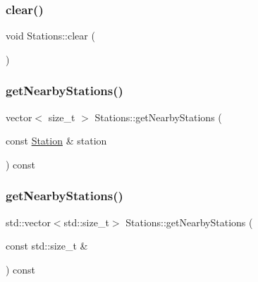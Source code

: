 \mbox{\label{class_stations_a4d69d6bf3e2504d3baccd53a7bd89888}} 
\subsubsection{\texorpdfstring{clear()}{clear()}}
{\footnotesize\ttfamily void Stations\+::clear (\begin{DoxyParamCaption}{ }\end{DoxyParamCaption})\hspace{0.3cm}{\ttfamily [noexcept]}}

\mbox{\label{class_stations_ac0438c6c8639d209dfc3937cfd993723}} 
\subsubsection{\texorpdfstring{get\+Nearby\+Stations()}{getNearbyStations()}\hspace{0.1cm}{\footnotesize\ttfamily [1/2]}}
{\footnotesize\ttfamily vector$<$ size\+\_\+t $>$ Stations\+::get\+Nearby\+Stations (\begin{DoxyParamCaption}\item[{const \mbox{\hyperlink{class_station}{Station}} \&}]{station }\end{DoxyParamCaption}) const}

\mbox{\label{class_stations_afebcca23df46c02b2d4dfe53da2f03d1}} 
\subsubsection{\texorpdfstring{get\+Nearby\+Stations()}{getNearbyStations()}\hspace{0.1cm}{\footnotesize\ttfamily [2/2]}}
{\footnotesize\ttfamily std\+::vector$<$std\+::size\+\_\+t$>$ Stations\+::get\+Nearby\+Stations (\begin{DoxyParamCaption}\item[{const std\+::size\+\_\+t \&}]{ }\end{DoxyParamCaption}) const}

